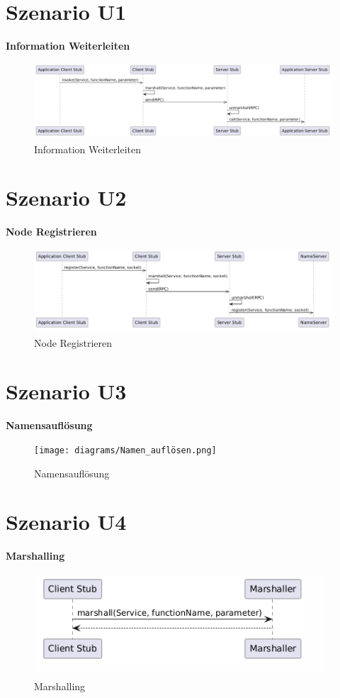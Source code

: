 \section{Szenario U1}
\textbf{Information Weiterleiten}\\
\begin{figure}[h!]
    \centering
    \includegraphics[width=0.8\linewidth]{diagrams/Information_Weiterleiten.png}
    \caption{Information Weiterleiten}
    \label{fig:Information_Weiterleiten}
\end{figure}
\clearpage

\section{Szenario U2}
\textbf{Node Registrieren}\\
\begin{figure}[h!]
    \centering
    \includegraphics[width=0.8\linewidth]{diagrams/Node_Registrieren.png}
    \caption{Node Registrieren}
    \label{fig:Node_Registrieren}
\end{figure}
\clearpage

\section{Szenario U3}
\textbf{Namensauflösung}\\
\begin{figure}[h!]
    \centering
    \texttt{[image: diagrams/Namen\_auflösen.png]}
    \caption{Namensauflösung}
    \label{fig:Namensauflösung}
\end{figure}
\clearpage

\section{Szenario U4}
\textbf{Marshalling}\\
\begin{figure}[h!]
    \centering
    \includegraphics[width=0.8\linewidth]{diagrams/Marshalling.png}
    \caption{Marshalling}
    \label{fig:Marshalling}
\end{figure}
\clearpage


